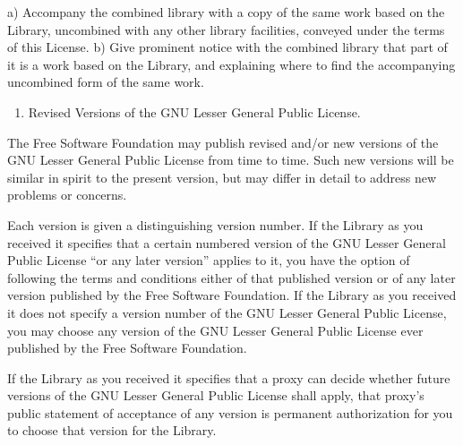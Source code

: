 \documentclass[a4paper,DIV=11
]{scrartcl}
\newcommand{\NormalTok}[1]{#1}
\begin{document}
\NormalTok{a) Accompany the combined library with a copy of the same work based on the Library, uncombined with any other library facilities, conveyed under the terms of this License.}
\NormalTok{b) Give prominent notice with the combined library that part of it is a work based on the Library, and explaining where to find the accompanying uncombined form of the same work.}


\begin{enumerate}
\def\labelenumi{\arabic{enumi}.}
\item
  Revised Versions of the GNU Lesser General Public License.
\end{enumerate}

The Free Software Foundation may publish revised and/or new versions of
the GNU Lesser General Public License from time to time. Such new
versions will be similar in spirit to the present version, but may
differ in detail to address new problems or concerns.

Each version is given a distinguishing version number. If the Library as
you received it specifies that a certain numbered version of the GNU
Lesser General Public License ``or any later version'' applies to it,
you have the option of following the terms and conditions either of that
published version or of any later version published by the Free Software
Foundation. If the Library as you received it does not specify a version
number of the GNU Lesser General Public License, you may choose any
version of the GNU Lesser General Public License ever published by the
Free Software Foundation.

If the Library as you received it specifies that a proxy can decide
whether future versions of the GNU Lesser General Public License shall
apply, that proxy's public statement of acceptance of any version is
permanent authorization for you to choose that version for the Library.
\end{document}
